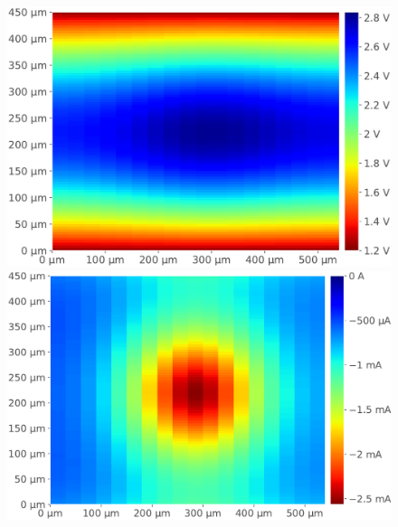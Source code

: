
\begin{figure}[hbtp]
%

	\begin{minipage}{0.5\textwidth}
		\includegraphics[width=\textwidth]{./figures/modelesSimusResul/dualWell/vddMgndManuscrit-cropped.pdf}
		\includegraphics[width=\textwidth]{./figures/modelesSimusResul/dualWell/iEpiDualWellManuscrit-cropped.pdf}

\end{minipage}
\end{figure}
